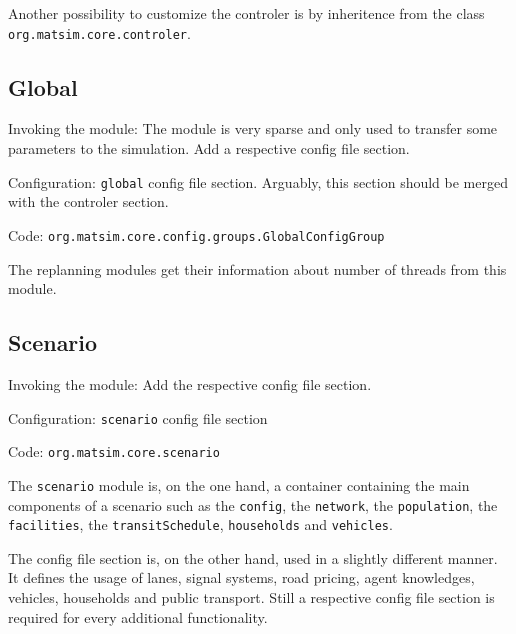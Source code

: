 Another possibility to customize the controler is by inheritence from the class \lstinline|org.matsim.core.controler|.

\subsection{Global}
\label{sec:global}
\begin{compactitem}
\item Invoking the module: The module is very sparse and only used to transfer some parameters to the simulation. Add a respective config file section.
\item Configuration: \lstinline|global| config file section. Arguably, this section should be merged with the controler section.
\item Code: \lstinline|org.matsim.core.config.groups.GlobalConfigGroup|
\end{compactitem}

The replanning modules get their information about number of threads from this module.

\subsection{Scenario}
\label{sec:scenario}
\begin{compactitem}
\item Invoking the module: Add the respective config file section.
\item Configuration: \lstinline|scenario| config file section 
\item Code: \lstinline|org.matsim.core.scenario|
\end{compactitem}

The \lstinline|scenario| module is, on the one hand, a container containing the main components of a scenario such as the \lstinline|config|, the \lstinline|network|, the \lstinline|population|, the \lstinline|facilities|, the \lstinline|transitSchedule|, \lstinline|households| and \lstinline|vehicles|.

The config file section is, on the other hand, used in a slightly different manner. It defines the usage of lanes, signal systems, road pricing, agent knowledges, vehicles, households and public transport. Still a respective config file section is required for every additional functionality.


